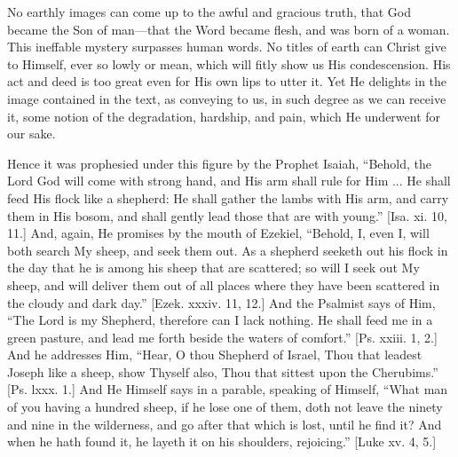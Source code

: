 No earthly images can come up to the awful and gracious truth, that
God became the Son of man—that the Word became flesh, and was born
of a woman. This ineffable mystery surpasses human words. No titles of
earth can Christ give to Himself, ever so lowly or mean, which will
fitly show us His condescension. His act and deed is too great even
for His own lips to utter it. Yet He delights in the image contained
in the text, as conveying to us, in such degree as we can receive it,
some notion of the degradation, hardship, and pain, which He underwent
for our sake.

Hence it was prophesied under this figure by the Prophet Isaiah,
``Behold, the Lord God will come with strong hand, and His arm
shall rule for Him ... He shall feed His flock like a shepherd: He
shall gather the lambs with His arm, and carry them in His bosom, and
shall gently lead those that are with young.'' [Isa. xi. 10, 11.]
And, again, He promises by the mouth of Ezekiel, ``Behold, I, even
I, will both search My sheep, and seek them out. As a shepherd seeketh
out his flock in the day that he is among his sheep that are
scattered; so will I seek out My sheep, and will deliver them out of
all places where they have been scattered in the cloudy and dark
day.'' [Ezek. xxxiv. 11, 12.] And the Psalmist says of Him,
``The Lord is my Shepherd, therefore can I lack nothing. He shall
feed me in a green pasture, and lead me forth beside the waters of
comfort.'' [Ps. xxiii. 1, 2.] And he addresses Him, ``Hear, O
thou Shepherd of Israel, Thou that leadest Joseph like a sheep, show
Thyself also, Thou that sittest upon the Cherubims.'' [Ps. lxxx.
1.] And He Himself says in a parable, speaking of Himself, ``What
man of you having a hundred sheep, if he lose one of them, doth not
leave the ninety and nine in the wilderness, and go after that which
is lost, until he find it? And when he hath found it, he layeth it on
his shoulders, rejoicing.'' [Luke xv. 4, 5.]


